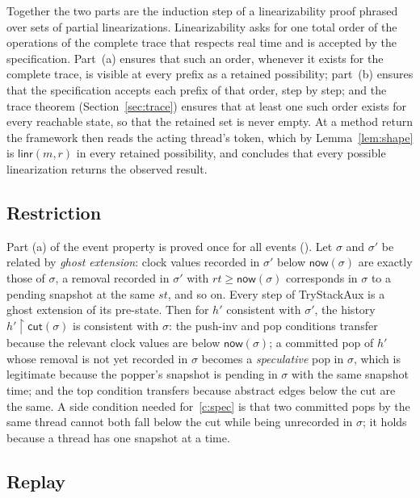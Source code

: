 \documentclass[11pt]{article}
\theoremstyle{definition}
\theoremstyle{remark}
\newcommand{\Linr}{\mathsf{linr}}
\newcommand{\conc}{\sigma}
\newcommand{\code}[1]{\texttt{\detokenize{#1}}}
\newcommand{\now}{\mathsf{now}}
\newcommand{\cut}{\mathsf{cut}}
\begin{document}
Together the two parts are the induction step of a linearizability proof
phrased over sets of partial linearizations.  Linearizability asks for one
total order of the operations of the complete trace that respects real time
and is accepted by the specification.  Part~(a) ensures that such an order,
whenever it exists for the complete trace, is visible at every prefix as a
retained possibility; part~(b) ensures that the specification accepts each
prefix of that order, step by step; and the trace theorem
(Section~\ref{sec:trace}) ensures that at least one such order exists for
every reachable state, so that the retained set is never empty.  At a method
return the framework then reads the acting thread's token, which by
Lemma~\ref{lem:shape} is \(\Linr(m,r)\) in every retained possibility, and
concludes that every possible linearization returns the observed result.

\subsection{Restriction}

Part (a) of the event property is proved once for all events
(\code{restrict_consistent}).  Let \(\conc\) and \(\conc'\) be related by
\emph{ghost extension}: clock values recorded in \(\conc'\) below
\(\now(\conc)\) are exactly those of \(\conc\), a removal recorded in
\(\conc'\) with \(rt\ge\now(\conc)\) corresponds in \(\conc\) to a pending
snapshot at the same \(st\), and so on.  Every step of TryStackAux is a ghost
extension of its pre-state.  Then for \(h'\) consistent with \(\conc'\), the
history \(h'{\restriction}\cut(\conc)\) is consistent with \(\conc\): the
push-inv and pop conditions transfer because the relevant clock values are
below \(\now(\conc)\); a committed pop of \(h'\) whose removal is not yet
recorded in \(\conc\) becomes a \emph{speculative} pop in \(\conc\), which
is legitimate because the popper's snapshot is pending in \(\conc\) with the
same snapshot time; and the top condition transfers because abstract edges
below the cut are the same.  A side condition needed for~\ref{c:spec} is
that two committed pops by the same thread cannot both fall below the cut
while being unrecorded in \(\conc\); it holds because a thread has one
snapshot at a time.

\subsection{Replay}
\end{document}
